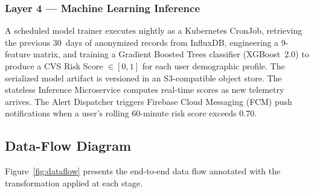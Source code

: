 \documentclass[conference]{IEEEtran}
\begin{document}
\subsubsection{Layer 4 — Machine Learning Inference}

A scheduled model trainer executes nightly as a Kubernetes CronJob, retrieving the
previous 30~days of anonymized records from InfluxDB, engineering a 9-feature matrix,
and training a Gradient Boosted Trees classifier (XGBoost~2.0) to produce a CVS Risk
Score $\in [0,1]$ for each user demographic profile. The serialized model artifact is
versioned in an S3-compatible object store. The stateless Inference Microservice
computes real-time scores as new telemetry arrives. The Alert Dispatcher triggers
Firebase Cloud Messaging (FCM) push notifications when a user's rolling 60-minute risk
score exceeds 0.70.

\subsection{Data-Flow Diagram}

Figure~\ref{fig:dataflow} presents the end-to-end data flow annotated with the
transformation applied at each stage.
\end{document}

